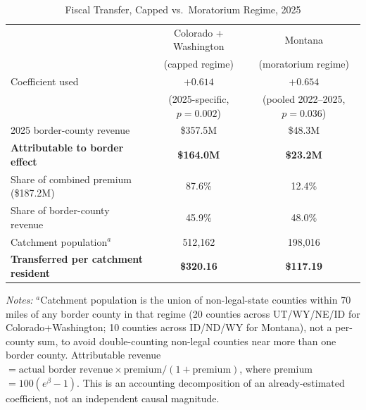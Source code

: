 \begin{table}[htbp]
\centering
\caption{Fiscal Transfer, Capped vs.\ Moratorium Regime, 2025}
\label{tab:magnitude}
\small
\begin{tabular}{lcc}
\toprule
& Colorado + Washington & Montana \\
& (capped regime) & (moratorium regime) \\
\midrule
Coefficient used & $+0.614$ & $+0.654$ \\
& (2025-specific, $p=0.002$) & (pooled 2022--2025, $p=0.036$) \\
2025 border-county revenue & \$357.5M & \$48.3M \\
\textbf{Attributable to border effect} & \textbf{\$164.0M} & \textbf{\$23.2M} \\
Share of combined premium (\$187.2M) & 87.6\% & 12.4\% \\
Share of border-county revenue & 45.9\% & 48.0\% \\
Catchment population$^{a}$ & 512{,}162 & 198{,}016 \\
\textbf{Transferred per catchment resident} & \textbf{\$320.16} & \textbf{\$117.19} \\
\bottomrule
\end{tabular}
\begin{minipage}{0.95\textwidth}
\vspace{0.3em}
\footnotesize
\textit{Notes:} $^{a}$Catchment population is the union of non-legal-state counties within 70 miles of any
border county in that regime (20 counties across UT/WY/NE/ID for Colorado+Washington; 10 counties across
ID/ND/WY for Montana), not a per-county sum, to avoid double-counting non-legal counties near more than
one border county. Attributable revenue $= \text{actual border revenue} \times \text{premium}/(1+\text{premium})$,
where premium $=100(e^{\beta}-1)$. This is an accounting decomposition of an already-estimated
coefficient, not an independent causal magnitude.
\end{minipage}
\end{table}
